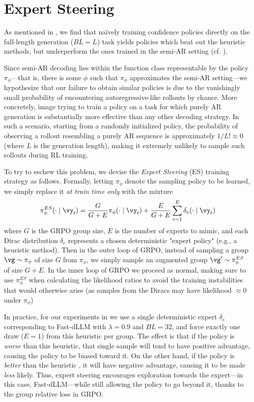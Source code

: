 \section{Expert Steering}
\label{sec:appendix-es}

As mentioned in ,
we find that na\"ively training confidence policies directly on the full-length generation ($BL = L$) task yields policies which beat out the heuristic methods, but underperform the ones trained in the semi-AR setting (cf. ).

Since semi-AR decoding lies within the function class representable by the policy $\pi_\phi$---that is, there is some $\phi$ such that $\pi_\phi$ approximates the semi-AR setting---we hypothesize that our failure to obtain similar policies is due to the vanishingly small probability of encountering autoregressive-like rollouts by chance. More concretely, image trying to train a policy on a task for which purely AR generation is substantially more effective than any other decoding strategy. In such a scenario, starting from a randomly initialized policy, the probability of observing a rollout resembling a purely AR sequence is approximately $1/L! \approx 0$ (where $L$ is the generation length), making it extremely unlikely to sample such rollouts during RL training. %

To try to eschew this problem, we devise the \emph{Expert Steering} (ES) training strategy as follows.
Formally, letting $\pi_\phi$ denote the sampling policy to be learned, we simply replace it \emph{at train time only} with the mixture
$$
\pi_\phi^{ES}(\cdot \mid \vy_t) = \frac{G}{G+E}\pi_\phi(\cdot \mid \vy_t)  + \frac{E}{G+E}\sum_{e = 1}^E \delta_e(\cdot \mid \vy_t) 
$$
where $G$ is the GRPO group size, $E$ is the number of experts to mimic, and each Dirac distribution $\delta_e$ represents a chosen deterministic "expert policy" (e.g., a heuristic method). %
Then in the outer loop of GRPO, instead of sampling a group $\vg \sim \pi_\phi$ of size $G$ from $\pi_\phi$, we simply sample an augmented group $\vg' \sim \pi_\phi^{ES}$ of size $G+E$.
In the inner loop of GRPO we proceed as normal, making sure to use $\pi_\phi^{ES}$ when calculating the likelihood ratios to avoid the training instabilities that would otherwise arise (as samples from the Diracs may have likelihood $\approx 0$ under $\pi_\phi$)

In practice, for our experiments in  we use a single deterministic expert $\delta_e$ corresponding to Fast-dLLM with $\lambda=0.9$ and  $BL=32$,
and force exactly one draw ($E=1$) from this heuristic per group.
The effect is that if the policy is \emph{worse} than this heuristic, that single sample will tend to have positive advantage, causing the policy to be biased toward it.
On the other hand, if the policy is \emph{better} than the heuristic%
, it will have negative advantage, causing it to be made \emph{less} likely.
Thus, expert steering encourages exploration towards the expert---in this case, Fast-dLLM---while still allowing the policy to go beyond it, thanks to the group relative loss in GRPO.
